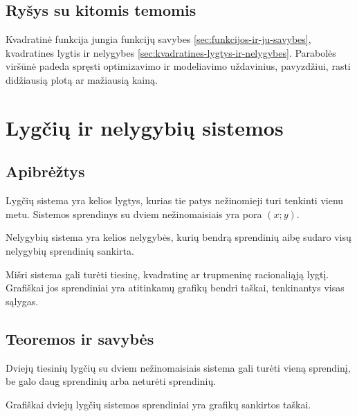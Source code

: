 \subsection{Ryšys su kitomis temomis}

Kvadratinė funkcija jungia funkcijų savybes \ref{sec:funkcijos-ir-ju-savybes}, kvadratines lygtis ir nelygybes \ref{sec:kvadratines-lygtys-ir-nelygybes}. Parabolės viršūnė padeda spręsti optimizavimo ir modeliavimo uždavinius, pavyzdžiui, rasti didžiausią plotą ar mažiausią kainą.

\section{Lygčių ir nelygybių sistemos}\label{sec:lygciu-ir-nelygybiu-sistemos}

\subsection{Apibrėžtys}

\begin{apibreztis}
Lygčių sistema yra kelios lygtys, kurias tie patys nežinomieji turi tenkinti vienu metu. Sistemos sprendinys su dviem nežinomaisiais yra pora $(x;y)$.
\end{apibreztis}

\begin{apibreztis}
Nelygybių sistema yra kelios nelygybės, kurių bendrą sprendinių aibę sudaro visų nelygybių sprendinių sankirta.
\end{apibreztis}

\begin{apibreztis}
Mišri sistema gali turėti tiesinę, kvadratinę ar trupmeninę racionaliąją lygtį. Grafiškai jos sprendiniai yra atitinkamų grafikų bendri taškai, tenkinantys visas sąlygas.
\end{apibreztis}

\subsection{Teoremos ir savybės}

\begin{savybe}
Dviejų tiesinių lygčių su dviem nežinomaisiais sistema gali turėti vieną sprendinį, be galo daug sprendinių arba neturėti sprendinių.
\end{savybe}

\begin{savybe}
Grafiškai dviejų lygčių sistemos sprendiniai yra grafikų sankirtos taškai.
\end{savybe}

